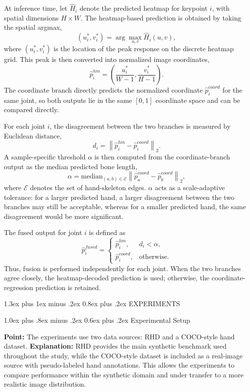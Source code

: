 \documentclass[10pt,letterpaper]{article}
\makeatletter
\renewcommand\section{\@startsection{section}{1}{\z@}%
  {1.3ex plus 1ex minus .2ex}%
  {0.8ex plus .2ex}%
  {\centering\normalfont\small\scshape}}
\renewcommand\subsection{\@startsection{subsection}{2}{\z@}%
  {1.0ex plus .8ex minus .2ex}%
  {0.6ex plus .2ex}%
  {\normalfont\itshape}}
\makeatother
\begin{document}
At inference time, let \(\hat{H}_i\) denote the predicted heatmap for keypoint \(i\), with spatial dimensions \(H \times W\). The heatmap-based prediction is obtained by taking the spatial argmax,
\[
(u_i^*, v_i^*) = \arg\max_{u,v} \hat{H}_i(u,v),
\]
where \((u_i^*, v_i^*)\) is the location of the peak response on the discrete heatmap grid. This peak is then converted into normalized image coordinates,
\[
\hat{p}^{hm}_i =
\left(
\frac{u_i^*}{W-1},
\frac{v_i^*}{H-1}
\right).
\]
The coordinate branch directly predicts the normalized coordinate \(\hat{p}^{coord}_i\) for the same joint, so both outputs lie in the same \([0,1]\) coordinate space and can be compared directly.

For each joint \(i\), the disagreement between the two branches is measured by Euclidean distance,
\[
d_i = \left\| \hat{p}^{hm}_i - \hat{p}^{coord}_i \right\|_2.
\]
A sample-specific threshold \(\alpha\) is then computed from the coordinate-branch output as the median predicted bone length,
\[
\alpha = \mathrm{median}_{(a,b)\in \mathcal{E}}
\left\| \hat{p}^{coord}_a - \hat{p}^{coord}_b \right\|_2,
\]
where \(\mathcal{E}\) denotes the set of hand-skeleton edges. \(\alpha\) acts as a scale-adaptive tolerance: for a larger predicted hand, a larger disagreement between the two branches may still be acceptable, whereas for a smaller predicted hand, the same disagreement would be more significant.

The fused output for joint \(i\) is defined as
\[
\hat{p}^{fused}_i =
\begin{cases}
\hat{p}^{hm}_i, & d_i < \alpha, \\
\hat{p}^{coord}_i, & \text{otherwise.}
\end{cases}
\]
Thus, fusion is performed independently for each joint. When the two branches agree closely, the heatmap-decoded prediction is used; otherwise, the coordinate-regression prediction is retained.

\section{EXPERIMENTS}

\subsection{Experimental Setup}

\noindent\textbf{Point:} The experiments use two data sources: RHD and a COCO-style hand dataset.  
\textbf{Explanation:} RHD provides the main synthetic benchmark used throughout the study, while the COCO-style dataset is included as a real-image source with pseudo-labeled hand annotations. This allows the experiments to compare performance within the synthetic domain and under transfer to a more realistic image distribution.
\end{document}
